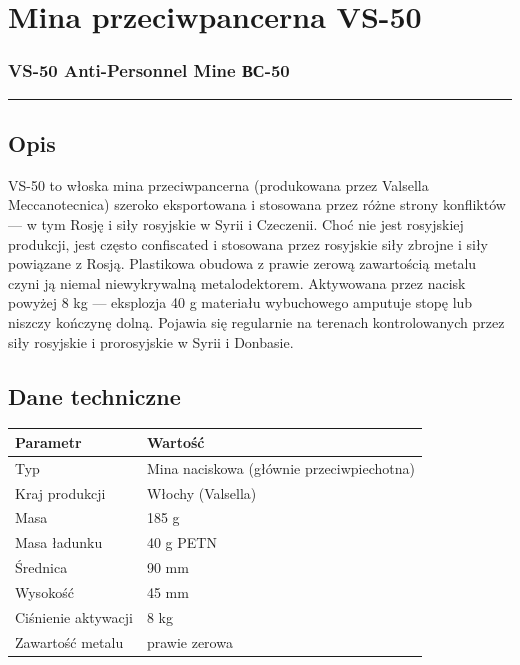 \documentclass[12pt,openany,oneside]{book}
\begin{document}
\chapter{Mina przeciwpancerna VS-50}\label{mina-przeciwpancerna-vs-50}

\subsection{VS-50 Anti-Personnel Mine \textbar{}
ВС-50}\label{vs-50-anti-personnel-mine-ux432ux441-50}

\begin{center}\rule{0.5\linewidth}{0.5pt}\end{center}

\section{Opis}\label{opis-119}

VS-50 to włoska mina przeciwpancerna (produkowana przez Valsella
Meccanotecnica) szeroko eksportowana i stosowana przez różne strony
konfliktów --- w tym Rosję i siły rosyjskie w Syrii i Czeczenii. Choć
nie jest rosyjskiej produkcji, jest często confiscated i stosowana przez
rosyjskie siły zbrojne i siły powiązane z Rosją. Plastikowa obudowa z
prawie zerową zawartością metalu czyni ją niemal niewykrywalną
metalodektorem. Aktywowana przez nacisk powyżej 8 kg --- eksplozja 40 g
materiału wybuchowego amputuje stopę lub niszczy kończynę dolną. Pojawia
się regularnie na terenach kontrolowanych przez siły rosyjskie i
prorosyjskie w Syrii i Donbasie.

\section{Dane techniczne}\label{dane-techniczne-119}

\begin{longtable}[]{@{}ll@{}}
\toprule\noalign{}
Parametr & Wartość \\
\midrule\noalign{}
\endhead
\bottomrule\noalign{}
\endlastfoot
Typ & Mina naciskowa (głównie przeciwpiechotna) \\
Kraj produkcji & Włochy (Valsella) \\
Masa & 185 g \\
Masa ładunku & 40 g PETN \\
Średnica & 90 mm \\
Wysokość & 45 mm \\
Ciśnienie aktywacji & 8 kg \\
Zawartość metalu & prawie zerowa \\
\end{longtable}
\end{document}
